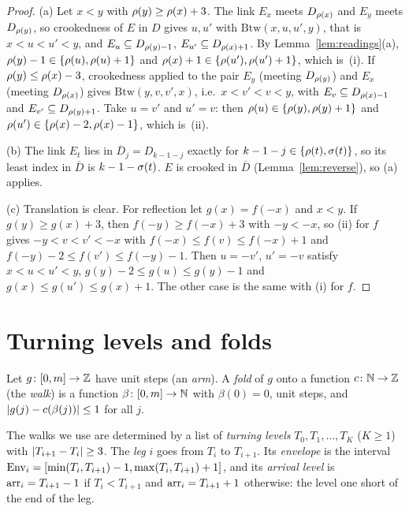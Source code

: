 \begin{proof}
(a) Let $x<y$ with $\rho(y)\ge\rho(x)+3$. The link $E_x$ meets $D_{\rho(x)}$ and $E_y$ meets $D_{\rho(y)}$, so crookedness of $E$ in $D$
gives $u,u'$ with $\mathrm{Btw}(x,u,u',y)$, that is $x<u<u'<y$, and $E_u\subseteq D_{\rho(y)-1}$, $E_{u'}\subseteq D_{\rho(x)+1}$.
By Lemma~\ref{lem:readings}(a), $\rho(y)-1\in\left\{ \rho(u),\rho(u)+1 \right\}$ and $\rho(x)+1\in\left\{ \rho(u'),\rho(u')+1 \right\}$, which is~(i).
If $\rho(y)\le\rho(x)-3$, crookedness applied to the pair $E_y$ (meeting $D_{\rho(y)}$) and $E_x$ (meeting $D_{\rho(x)}$) gives
$\mathrm{Btw}(y,v,v',x)$, i.e.\ $x<v'<v<y$, with $E_v\subseteq D_{\rho(x)-1}$ and $E_{v'}\subseteq D_{\rho(y)+1}$. Take $u=v'$ and
$u'=v$: then $\rho(u)\in\left\{ \rho(y),\rho(y)+1 \right\}$ and $\rho(u')\in\left\{ \rho(x)-2,\rho(x)-1 \right\}$, which is~(ii).

(b) The link $E_t$ lies in $\overline D_j=D_{k-1-j}$ exactly for $k-1-j\in\left\{ \rho(t),\sigma(t) \right\}$, so its least index in $\overline D$
is $k-1-\sigma(t)$. $E$ is crooked in $\overline D$ (Lemma~\ref{lem:reverse}), so (a) applies.

(c) Translation is clear. For reflection let $g(x)=f(-x)$ and $x<y$. If $g(y)\ge g(x)+3$, then $f(-y)\ge f(-x)+3$ with $-y<-x$,
so (ii) for $f$ gives $-y<v<v'<-x$ with $f(-x)\le f(v)\le f(-x)+1$ and $f(-y)-2\le f(v')\le f(-y)-1$. Then $u=-v'$, $u'=-v$
satisfy $x<u<u'<y$, $g(y)-2\le g(u)\le g(y)-1$ and $g(x)\le g(u')\le g(x)+1$. The other case is the same with (i) for $f$.
\end{proof}


\section{Turning levels and folds}\label{sec:fold-folds}

\begin{definition}[Folds]\label{def:fold}
Let $g\colon[0,m]\to\mathbb{Z}$ have unit steps (an \emph{arm}). A \emph{fold} of $g$ onto a function $c\colon\mathbb{N}\to\mathbb{Z}$ (the \emph{walk}) is a
function $\beta\colon[0,m]\to\mathbb{N}$ with $\beta(0)=0$, unit steps, and $\left\lvert g(j)-c(\beta(j))\right\rvert\le1$ for all $j$.
\end{definition}

The walks we use are determined by a list of \emph{turning levels} $T_0,T_1,\dots,T_K$ ($K\ge1$) with
$\left\lvert T_{i+1}-T_i\right\rvert\ge3$. The \emph{leg} $i$ goes from $T_i$ to $T_{i+1}$. Its \emph{envelope} is the interval
$\operatorname{Env}_i=[\min(T_i,T_{i+1})-1,\max(T_i,T_{i+1})+1]$, and its \emph{arrival level} is $\operatorname{arr}_i=T_{i+1}-1$ if $T_i<T_{i+1}$ and
$\operatorname{arr}_i=T_{i+1}+1$ otherwise: the level one short of the end of the leg.

